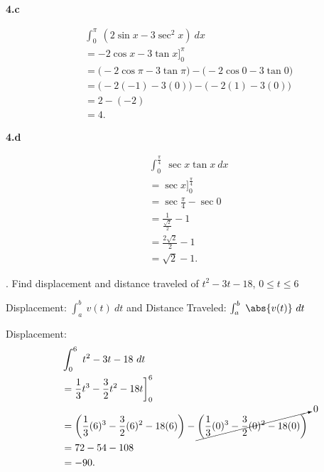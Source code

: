\documentclass{report}
\begin{document}
    \bigbreak \noindent 
    \textbf{4.c}
    \bigbreak \noindent 
    \begin{minipage}{0.7\textwidth}
    \begin{align*}
        &\int_{0}^{\pi}\ (2\sin{x}-3\sec^{2}{x})\ dx \\
        &=-2\cos{x}-3\tan{x}\bigg]^{\pi}_0 \\
        &= \bigg(-2\cos{\pi}-3\tan{\pi}\bigg) - \bigg(-2\cos{0}-3\tan{0}\bigg) \\
        &= \bigg(-2(-1)-3(0)\bigg) - \bigg(-2(1)-3(0)\bigg) \\
        &= 2 - (-2) \\
        &= 4
    .\end{align*}
    \end{minipage}

    \pagebreak \bigbreak \noindent 
    \textbf{4.d}
    \bigbreak \noindent 
    \begin{minipage}{0.7\textwidth}
    \begin{align*}
        &\int_{0}^{\frac{\pi}{4}}\ \sec{x}\tan{x}\ dx \\
        &= \sec{x}\bigg]^{\frac{\pi}{4}}_0 \\
        &= \sec{\frac{\pi}{4}} - \sec{0} \\
        &= \frac{1}{\frac{\sqrt{2}}{2}} - 1 \\
        &= \frac{2\sqrt{2}}{2} - 1 \\
        &= \sqrt{2} -1
    .\end{align*}
    \end{minipage}

    \bigbreak {}. Find displacement and distance traveled of $t^{2}-3t-18$, $0 \leq t \leq 6 $
    \bigbreak \noindent 
    \begin{remark}
        Displacement: $\int_{a}^{b}\ v(t)\ dt$ and 
        Distance Traveled: $\int_{a}^{b}\ \abs{v(t)}\ dt $
    \end{remark}
    \bigbreak \noindent 

    Displacement:
    \begin{align*}
        &\int_{0}^{6}\ t^{2}-3t-18\ dt \\
        &= \frac{1}{3}t^{3}-\frac{3}{2}t^{2}-18t\bigg]^{6}_0 \\
        &= \bigg(\frac{1}{3}(6)^{3} - \frac{3}{2}(6)^{2}-18(6)\bigg) - \cancelto{0}{\bigg(\frac{1}{3}(0)^{3} -\frac{3}{2}(0)^{2}-18(0)\bigg)} \\
        &= 72 - 54 - 108 \\
        &= -90
    .\end{align*}
    \bigbreak \noindent 
\end{document}
